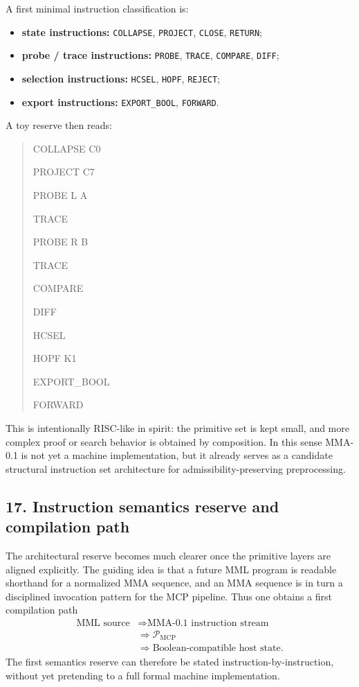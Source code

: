 A first minimal instruction classification is:
\begin{itemize}[leftmargin=2em]
  \item \textbf{state instructions:} \texttt{COLLAPSE}, \texttt{PROJECT}, \texttt{CLOSE}, \texttt{RETURN};
  \item \textbf{probe / trace instructions:} \texttt{PROBE}, \texttt{TRACE}, \texttt{COMPARE}, \texttt{DIFF};
  \item \textbf{selection instructions:} \texttt{HCSEL}, \texttt{HOPF}, \texttt{REJECT};
  \item \textbf{export instructions:} \texttt{EXPORT\_BOOL}, \texttt{FORWARD}.
\end{itemize}
A toy reserve then reads:
\begin{quote}
\ttfamily
COLLAPSE C0 \par
PROJECT C7 \par
PROBE L A \par
TRACE \par
PROBE R B \par
TRACE \par
COMPARE \par
DIFF \par
HCSEL \par
HOPF K1 \par
EXPORT\_BOOL \par
FORWARD
\end{quote}
This is intentionally RISC-like in spirit: the primitive set is kept small, and more complex proof or search behavior is obtained by composition. In this sense MMA-0.1 is not yet a machine implementation, but it already serves as a candidate structural instruction set architecture for admissibility-preserving preprocessing.


\subsection*{17. Instruction semantics reserve and compilation path}
The architectural reserve becomes much clearer once the primitive layers are aligned explicitly. The guiding idea is that a future MML program is readable shorthand for a normalized MMA sequence, and an MMA sequence is in turn a disciplined invocation pattern for the MCP pipeline. Thus one obtains a first compilation path
\[
\begin{aligned}
\text{MML source}
&\Longrightarrow \text{MMA-0.1 instruction stream}\\
&\Longrightarrow \mathcal P_{\mathrm{MCP}}\\
&\Longrightarrow \text{Boolean-compatible host state}.
\end{aligned}
\]
The first semantics reserve can therefore be stated instruction-by-instruction, without yet pretending to a full formal machine implementation.

